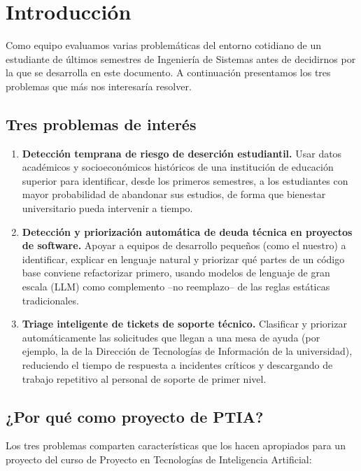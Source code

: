 \section{Introducción}

Como equipo evaluamos varias problemáticas del entorno cotidiano de un estudiante de últimos semestres de Ingeniería de Sistemas antes de decidirnos por la que se desarrolla en este documento. A continuación presentamos los tres problemas que más nos interesaría resolver.

\subsection{Tres problemas de interés}

\begin{enumerate}
    \item \textbf{Detección temprana de riesgo de deserción estudiantil.} Usar datos académicos y socioeconómicos históricos de una institución de educación superior para identificar, desde los primeros semestres, a los estudiantes con mayor probabilidad de abandonar sus estudios, de forma que bienestar universitario pueda intervenir a tiempo.
    \item \textbf{Detección y priorización automática de deuda técnica en proyectos de software.} Apoyar a equipos de desarrollo pequeños (como el nuestro) a identificar, explicar en lenguaje natural y priorizar qué partes de un código base conviene refactorizar primero, usando modelos de lenguaje de gran escala (LLM) como complemento --no reemplazo-- de las reglas estáticas tradicionales.
    \item \textbf{Triage inteligente de tickets de soporte técnico.} Clasificar y priorizar automáticamente las solicitudes que llegan a una mesa de ayuda (por ejemplo, la de la Dirección de Tecnologías de Información de la universidad), reduciendo el tiempo de respuesta a incidentes críticos y descargando de trabajo repetitivo al personal de soporte de primer nivel.
\end{enumerate}

\subsection{¿Por qué como proyecto de PTIA?}

Los tres problemas comparten características que los hacen apropiados para un proyecto del curso de Proyecto en Tecnologías de Inteligencia Artificial:

